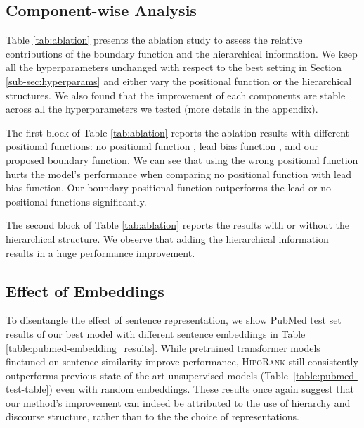 \documentclass[11pt,a4paper]{article}
\begin{document}
\subsection{Component-wise Analysis} Table \ref{tab:ablation} presents the ablation study to assess the relative contributions of the boundary function and the hierarchical information. We keep all the hyperparameters unchanged with respect to the best setting in Section \ref{sub-sec:hyperparams} and either vary the positional function or the hierarchical structures.  We also found that the improvement of each components are stable across all the hyperparameters we tested (more details in the appendix). 

The first block of Table \ref{tab:ablation} reports the ablation results with different positional functions: no positional function \citep{erkan2004lexrank,mihalcea2004textrank}, lead bias function  \citep{zheng2019sentence}, and our proposed boundary function. We can see that using the wrong positional function hurts the model's performance when comparing no positional function with lead bias function. Our boundary positional function outperforms the lead or no positional functions significantly. 

The second block of Table \ref{tab:ablation} reports the results with or without the hierarchical structure. We observe that adding the hierarchical information results in a huge performance improvement. 

\subsection{Effect of Embeddings}\label{sub-sec:embeddings}
To disentangle the effect of sentence representation, we show PubMed test set results of our best model with different sentence embeddings in Table \ref{table:pubmed-embedding_results}. While pretrained transformer models finetuned on sentence similarity improve performance, \textsc{HipoRank} still consistently outperforms previous state-of-the-art unsupervised models (Table~\ref{table:pubmed-test-table}) even with random embeddings. These results once again suggest that our method's improvement can indeed be attributed to the use of hierarchy and discourse structure, rather than to the the choice of representations. 
\end{document}
